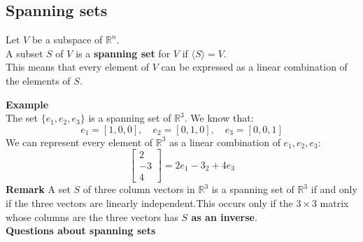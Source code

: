 \documentclass[a4paper, 9pt]{extarticle}
\begin{document}
\subsection{Spanning sets}
\begin{definitionbox}{}{}
  Let $V$ be a subspace of $\mathbb{R}^n$. \\[2ex]

  A subset $S$ of $V$ is a \textbf{spanning set} for $V$ if $\langle S \rangle = V$. \\[2ex]
  This means that every element of $V$ can be expressed as a linear combination of the elements of $S$.
\end{definitionbox}
\noindent\textbf{Example} \\
The set $\{e_1, e_2, e_3\}$ is a spanning set of $\mathbb{R}^3$. We know that:
$$e_1 = [1, 0, 0], \quad e_2 = [0, 1, 0], \quad e_3 = [0, 0, 1]$$
We can represent every element of $\mathbb{R}^3$ as a linear combination of $e_1, e_2, e_3$:
$$
  \begin{bmatrix}
    2  \\
    -3 \\
    4
  \end{bmatrix}
  =
  2e_1 -3_2 + 4e_3
$$
\textbf{Remark} A set $S$ of three column vectors in $\mathbb{R}^3$ is a spanning set of $\mathbb{R}^3$ if and only if the three vectors are linearly independent.This occurs only if the $3 \times 3$ matrix whose columns are the three vectors has \textbf{$S$ as an inverse}.\\[2ex]
\textbf{Questions about spanning sets}
\end{document}

